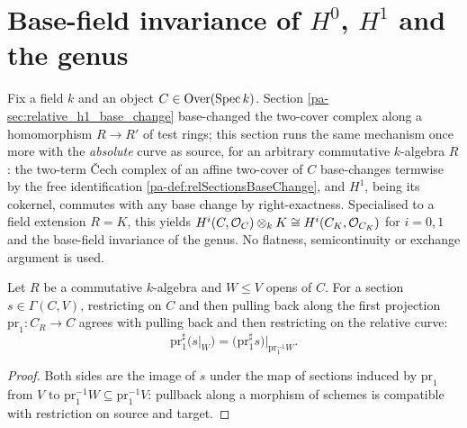 \section{Base-field invariance of \(H^0\), \(H^1\) and the genus}
\label{pa-sec:h1_base_field_invariance}

Fix a field \(k\) and an object \(C \in \mathrm{Over}(\operatorname{Spec} k)\). Section
\ref{pa-sec:relative_h1_base_change} base-changed the two-cover complex along a
homomorphism \(R \to R'\) of test rings; this section runs the same mechanism once more
with the \emph{absolute} curve as source, for an arbitrary commutative \(k\)-algebra
\(R\): the two-term \v{C}ech complex of an affine two-cover of \(C\) base-changes
termwise by the free identification \ref{pa-def:relSectionsBaseChange}, and \(H^1\), being
its cokernel, commutes with any base change by right-exactness. Specialised to a field
extension \(R = K\), this yields \(H^i(C, \mathcal{O}_{C}) \otimes_k K \cong
H^i(C_K, \mathcal{O}_{C_K})\) for \(i = 0, 1\) and the base-field invariance of the genus.
No flatness, semicontinuity or exchange argument is used.

\begin{lemma}
  \label{pa-lem:relPullbackSection_resHom}
  \leanok

  Let \(R\) be a commutative \(k\)-algebra and \(W \leq V\) opens of \(C\). For a
  section \(s \in \Gamma(C, V)\), restricting on \(C\) and then pulling back along the
  first projection \(\mathrm{pr}_1 : C_R \to C\) agrees with pulling back and then
  restricting on the relative curve:
  \[
    \mathrm{pr}_1^{\sharp}\bigl(s|_W\bigr)
      = \bigl(\mathrm{pr}_1^{\sharp} s\bigr)\big|_{\mathrm{pr}_1^{-1} W}.
  \]
\end{lemma}
\begin{proof}
  \leanok
  Both sides are the image of \(s\) under the map of sections induced by
  \(\mathrm{pr}_1\) from \(V\) to \(\mathrm{pr}_1^{-1}W \subseteq \mathrm{pr}_1^{-1}V\):
  pullback along a morphism of schemes is compatible with restriction on source and
  target.
\end{proof}

